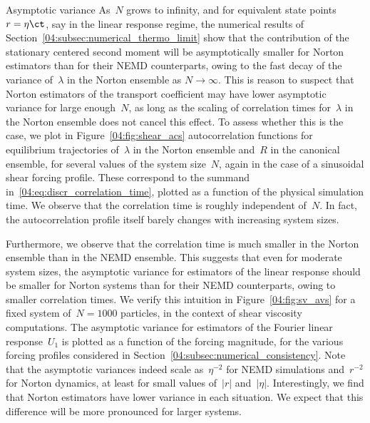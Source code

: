 \begin{subsection}{Asymptotic variance}
    As~$N$ grows to infinity, and for equivalent state points~$r=\eta\ct$, say in the linear response regime, the numerical results of Section~\ref{04:subsec:numerical_thermo_limit} show that the contribution of the stationary centered second moment will be asymptotically smaller for Norton estimators than for their NEMD counterparts, owing to the fast decay of the variance of~$\lambda$ in the Norton ensemble as $N\to\infty$. This is reason to suspect that Norton estimators of the transport coefficient may have lower asymptotic variance for large enough~$N$, as long as the scaling of correlation times for~$\lambda$ in the Norton ensemble does not cancel this effect. To assess whether this is the case,  we plot in Figure~\ref{04:fig:shear_acs} autocorrelation functions for equilibrium trajectories of~$\lambda$ in the Norton ensemble and~$R$ in the canonical ensemble, for several values of the system size~$N$, again in the case of a sinusoidal shear forcing profile. These correspond to the summand in~\eqref{04:eq:discr_correlation_time}, plotted as a function of the physical simulation time. We observe that the correlation time is roughly independent of~$N$. In fact, the autocorrelation profile itself barely changes with increasing system sizes.
    
    Furthermore, we observe that the correlation time is much smaller in the Norton ensemble than in the NEMD ensemble. This suggests that even for moderate system sizes, the asymptotic variance for estimators of the linear response should be smaller for Norton systems than for their NEMD counterparts, owing to smaller correlation times. We verify this intuition in Figure~\ref{04:fig:sv_avs} for a fixed system of~$N=1000$ particles, in the context of shear viscosity computations. The asymptotic variance for estimators of the Fourier linear response~$U_1$ is plotted as a function of the forcing magnitude, for the various forcing profiles considered in Section~\ref{04:subsec:numerical_consistency}. Note that the asymptotic variances indeed scale as~$\eta^{-2}$ for NEMD simulations and~$r^{-2}$ for Norton dynamics, at least for small values of~$|r|$ and~$|\eta|$. Interestingly, we find that Norton estimators have lower variance in each situation. We expect that this difference will be more pronounced for larger systems.


\end{subsection}

